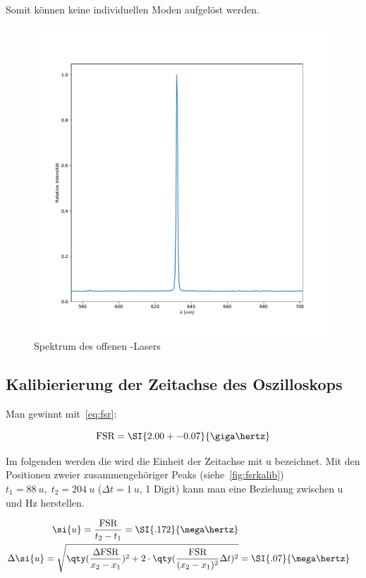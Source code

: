 \documentclass[slug=GL, room=HZDR\ Dresden/Rossendorf\,\ Geb.\ 620/123, supervisor=Tim\ Ziegler]{../../Lab_Report_LaTeX/lab_report}
\newcommand{\hne}{\ce{HeNe}-Laser}
\begin{document}
Somit k\"onnen keine individuellen Moden aufgel\"ost werden.
\begin{figure}[b]\centering
  \includegraphics[width=.8\columnwidth]{figs/faserspek.pdf}
  \caption{Spektrum des offenen \hne{}s}
  \label{fig:faserspek}
\end{figure}

\subsection{Kalibierierung der Zeitachse des Oszilloskops}
\label{sec:kalibzeitausw}

Man gewinnt mit~\ref{eq:fsr}:

\begin{equation}
  \label{eq:realfsr}
  \text{FSR} = \SI{2.00+-0.07}{\giga\hertz}
\end{equation}

Im folgenden werden die wird die Einheit der Zeitachse mit \si{u}
bezeichnet. Mit den Positionen zweier zusammengeh\"origer Peaks (siehe~\ref{fig:fsrkalib})
\(t_1=\SI{88}{u},\; t_2=\SI{204}{u}\) (\(\Delta t = \SI{1}{u}\), 1 Digit)
kann man eine Beziehung zwischen \si{u} und \si{\hertz} herstellen.

\begin{eqnarray}
  \label{eq:unithertz}
  \si{u} = \frac{\text{FSR}}{t_2-t_1} =\SI{.172}{\mega\hertz} \\
  \Delta\si{u}  = \sqrt{\qty(\frac{\Delta\text{FSR}}{x_2-x_1})^2 +
  2\cdot\qty(\frac{\text{FSR}}{(x_2-x_1)^2}\Delta t)^2}  & = \SI{.07}{\mega\hertz}
\end{eqnarray}
\end{document}
